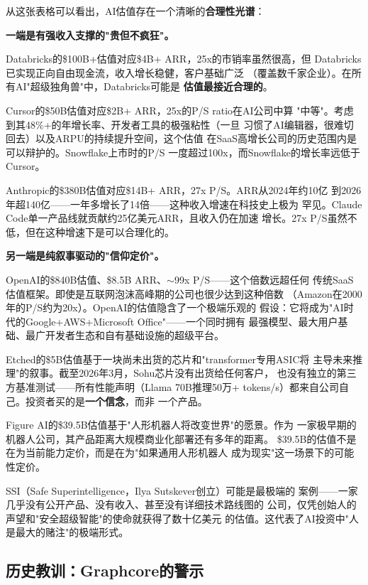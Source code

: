 从这张表格可以看出，AI估值存在一个清晰的\textbf{合理性光谱}：

\textbf{一端是有强收入支撑的"贵但不疯狂"。}

Databricks的\$100B+估值对应\$4B+ ARR，25x的市销率虽然很高，但
Databricks已实现正向自由现金流，收入增长稳健，客户基础广泛
（覆盖数千家企业）。在所有AI"超级独角兽"中，Databricks可能是
\textbf{估值最接近合理的}。

Cursor的\$50B估值对应\$2B+ ARR，25x的P/S ratio在AI公司中算
"中等"。考虑到其48\%+的年增长率、开发者工具的极强粘性（一旦
习惯了AI编辑器，很难切回去）以及ARPU的持续提升空间，这个估值
在SaaS高增长公司的历史范围内是可以辩护的。Snowflake上市时的P/S
一度超过100x，而Snowflake的增长率远低于Cursor。

Anthropic的\$380B估值对应\$14B+ ARR，27x P/S。ARR从2024年约10亿
到2026年超140亿——一年多增长了14倍——这种收入增速在科技史上极为
罕见。Claude Code单一产品线就贡献约25亿美元ARR，且收入仍在加速
增长。27x P/S虽然不低，但在这种增速下是可以合理化的。

\textbf{另一端是纯叙事驱动的"信仰定价"。}

OpenAI的\$840B估值、\$8.5B ARR、$\sim$99x P/S——这个倍数远超任何
传统SaaS估值框架。即使是互联网泡沫高峰期的公司也很少达到这种倍数
（Amazon在2000年的P/S约为20x）。OpenAI的估值隐含了一个极端乐观的
假设：它将成为"AI时代的Google+AWS+Microsoft Office"——一个同时拥有
最强模型、最大用户基础、最广开发者生态和自有基础设施的超级平台。

Etched的\$5B估值基于一块尚未出货的芯片和"transformer专用ASIC将
主导未来推理"的叙事。截至2026年3月，Sohu芯片没有出货给任何客户，
也没有独立的第三方基准测试——所有性能声明（Llama 70B推理50万+
tokens/s）都来自公司自己。投资者买的是\textbf{一个信念}，而非
一个产品。

Figure AI的\$39.5B估值基于"人形机器人将改变世界"的愿景。作为
一家极早期的机器人公司，其产品距离大规模商业化部署还有多年的距离。
\$39.5B的估值不是在为当前能力定价，而是在为"如果通用人形机器人
成为现实"这一场景下的可能性定价。

SSI（Safe Superintelligence，Ilya Sutskever创立）可能是最极端的
案例——一家几乎没有公开产品、没有收入、甚至没有详细技术路线图的
公司，仅凭创始人的声望和"安全超级智能"的使命就获得了数十亿美元
的估值。这代表了AI投资中"人是最大的赌注"的极端形式。

\subsection{历史教训：Graphcore的警示}
\label{subsec:fund-graphcore}

